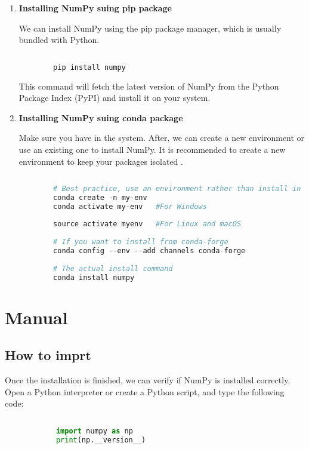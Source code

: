 \begin{enumerate}
	
	\item \textbf{Installing NumPy suing pip package}
	
	We can  install NumPy using the pip package manager, which is usually bundled with Python. 
	
	\begin{lstlisting}[language=Python]
		
		pip install numpy
	\end{lstlisting}
	
	This command will fetch the latest version of NumPy from the Python Package Index (PyPI) and install it on your system.
	
	\item \textbf{Installing NumPy suing conda package}
	
	Make sure you have 	 in the system. After, we can create a new environment or use an existing one to install NumPy. It is recommended to create a new environment to keep your packages isolated \cite{oliphant2006}. 
	
	\begin{lstlisting}[language=Python]
		
		# Best practice, use an environment rather than install in the base env
		conda create -n my-env
		conda activate my-env	#For Windows
		
		source activate myenv	#For Linux and macOS
		
		# If you want to install from conda-forge
		conda config --env --add channels conda-forge
		
		# The actual install command
		conda install numpy
	\end{lstlisting}
	
\end{enumerate}


\section{Manual}

	\subsection{How to imprt}
	
		Once the installation is finished, we can verify if NumPy is installed correctly. Open a Python interpreter or create a Python script, and type the following code:
	
		\begin{lstlisting}[language=Python]
			
			import numpy as np
			print(np.__version__)
		\end{lstlisting}
		

